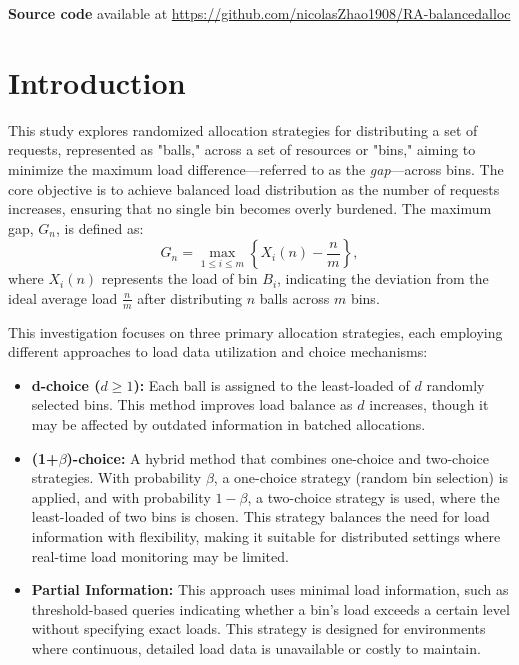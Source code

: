\documentclass[11pt]{article}
\title{Assignment 2 - Balanced Allocations \\ \vskip 1em \Large Randomized Algorithms}
\author[*]{Nicolás Zhao}
\affil[*]{Universitat Politècnica de Catalunya (UPC)}
\affil[*]{\textit{nicolas.zhao@estudiantat.upc.edu}}
\date{\today}
\begin{document}
\maketitle

\begin{center}
  \textbf{Source code} available at \url{https://github.com/nicolasZhao1908/RA-balancedalloc}
\end{center}

\section{Introduction}

This study explores randomized allocation strategies for distributing a set of
requests, represented as "balls," across a set of resources or "bins," aiming
to minimize the maximum load difference—referred to as the \textit{gap}—across
bins. The core objective is to achieve balanced load distribution as the number
of requests increases, ensuring that no single bin becomes overly burdened. The
maximum gap, $G_n$, is defined as:
\[
G_n = \operatorname*{max}_{1 \le i \le m} \left\{ X_i(n) - \frac{n}{m} \right\},
\]
where $X_i(n)$ represents the load of bin $B_i$, indicating the deviation from
the ideal average load $\frac{n}{m}$ after distributing $n$ balls across $m$
bins.

This investigation focuses on three primary allocation strategies, each
employing different approaches to load data utilization and choice mechanisms:

\begin{itemize}
  \item \textbf{d-choice ($d \ge 1$):} Each ball is assigned to the
    least-loaded of $d$ randomly selected bins. This method improves load
    balance as $d$ increases, though it may be affected by outdated information
    in batched allocations.
  
  \item \textbf{(1+$\beta$)-choice:} A hybrid method that combines one-choice
    and two-choice strategies. With probability $\beta$, a one-choice strategy
    (random bin selection) is applied, and with probability $1 - \beta$, a
    two-choice strategy is used, where the least-loaded of two bins is chosen.
    This strategy balances the need for load information with flexibility,
    making it suitable for distributed settings where real-time load monitoring
    may be limited.

  \item \textbf{Partial Information:} This approach uses minimal load
    information, such as threshold-based queries indicating whether a bin’s
    load exceeds a certain level without specifying exact loads. This strategy
    is designed for environments where continuous, detailed load data is
    unavailable or costly to maintain.

\end{itemize}
\end{document}

